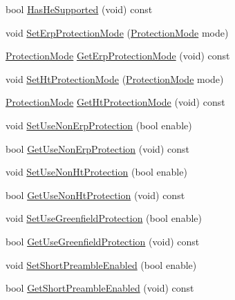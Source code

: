 \begin{DoxyCompactItemize}
\item 
bool \hyperlink{classns3_1_1WifiRemoteStationManager_a5c442e5a306eab9a69b7cd2dcead57dc}{Has\+He\+Supported} (void) const 
\item 
void \hyperlink{classns3_1_1WifiRemoteStationManager_abb4e4d7598af1c817e6361507c633f88}{Set\+Erp\+Protection\+Mode} (\hyperlink{classns3_1_1WifiRemoteStationManager_acd7d97851233efb176637f24b3f8abd6}{Protection\+Mode} mode)
\item 
\hyperlink{classns3_1_1WifiRemoteStationManager_acd7d97851233efb176637f24b3f8abd6}{Protection\+Mode} \hyperlink{classns3_1_1WifiRemoteStationManager_a016cd8bb1b82136991e86afa18883a8d}{Get\+Erp\+Protection\+Mode} (void) const 
\item 
void \hyperlink{classns3_1_1WifiRemoteStationManager_afdcb8e121600316024ecb2eb7b3a477a}{Set\+Ht\+Protection\+Mode} (\hyperlink{classns3_1_1WifiRemoteStationManager_acd7d97851233efb176637f24b3f8abd6}{Protection\+Mode} mode)
\item 
\hyperlink{classns3_1_1WifiRemoteStationManager_acd7d97851233efb176637f24b3f8abd6}{Protection\+Mode} \hyperlink{classns3_1_1WifiRemoteStationManager_ab5b352c44142b3b0bd147b7acbd79b59}{Get\+Ht\+Protection\+Mode} (void) const 
\item 
void \hyperlink{classns3_1_1WifiRemoteStationManager_a409e92951019a05af1266a30c14995d2}{Set\+Use\+Non\+Erp\+Protection} (bool enable)
\item 
bool \hyperlink{classns3_1_1WifiRemoteStationManager_a2d3d93f08995e554960a177a52f90f2f}{Get\+Use\+Non\+Erp\+Protection} (void) const 
\item 
void \hyperlink{classns3_1_1WifiRemoteStationManager_a71c8b8aa4d3446546af13b4dc2ea641f}{Set\+Use\+Non\+Ht\+Protection} (bool enable)
\item 
bool \hyperlink{classns3_1_1WifiRemoteStationManager_a40ea82057822461fa96fb7f6da8a93b3}{Get\+Use\+Non\+Ht\+Protection} (void) const 
\item 
void \hyperlink{classns3_1_1WifiRemoteStationManager_af420085117ec1e0f26fc494cc978ab7d}{Set\+Use\+Greenfield\+Protection} (bool enable)
\item 
bool \hyperlink{classns3_1_1WifiRemoteStationManager_a806dfd5b53fdabf3497cf3946236da34}{Get\+Use\+Greenfield\+Protection} (void) const 
\item 
void \hyperlink{classns3_1_1WifiRemoteStationManager_a66a2f347bbc24c14a38da8dc56781cc8}{Set\+Short\+Preamble\+Enabled} (bool enable)
\item 
bool \hyperlink{classns3_1_1WifiRemoteStationManager_a3c14f412938ed4120572c5e0c5511d0f}{Get\+Short\+Preamble\+Enabled} (void) const 

\end{DoxyCompactItemize}
